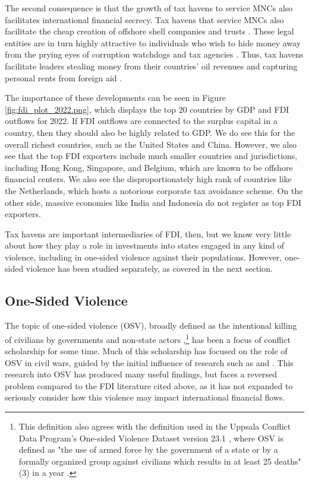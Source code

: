 \documentclass[11pt, titlepage]{article} %
\begin{document}
The second consequence is that the growth of tax havens to service MNCs also facilitates international financial secrecy. Tax havens that service MNCs also facilitate the cheap creation of offshore shell companies and trusts \parencite{findleyGlobalShellGames2012}. These legal entities are in turn highly attractive to individuals who wish to hide money away from the prying eyes of corruption watchdogs and tax agencies \parencite{christensenLootingContinuesTax2011, cooleyTransnationalCorruptionGlobalized2017}. Thus, tax havens facilitate leaders stealing money from their countries’ oil revenues \parencite{andersenPetroRentsPolitical2017} and capturing personal rents from foreign aid \parencite{andersenEliteCaptureForeign2020}. 

The importance of these developments can be seen in Figure \ref{fig:fdi_plot_2022.png}, which displays the top 20 countries by GDP and FDI outflows for 2022. If FDI outflows are connected to the surplus capital in a country, then they should also be highly related to GDP. We do see this for the overall richest countries, such as the United States and China. However, we also see that the top FDI exporters include much smaller countries and jurisdictions, including Hong Kong, Singapore, and Belgium, which are known to be offshore financial centers. We also see the disproportionately high rank of countries like the Netherlands, which hosts a notorious corporate tax avoidance scheme. On the other side, massive economies like India and Indonesia do not register as top FDI exporters. 

Tax havens are important intermediaries of FDI, then, but we know very little about how they play a role in investments into states engaged in any kind of violence, including in one-sided violence against their populations. However, one-sided violence has been studied separately, as covered in the next section. 

\subsection*{One-Sided Violence}

The topic of one-sided violence (OSV), broadly defined as the intentional killing of civilians by governments and non-state actors \parencite{fjelde2021introducing},\footnote{This definition also agrees with the definition used in the Uppsala Conflict Data Program’s One-sided Violence Dataset version 23.1 \parencite{eck2007one,davies2023organized}, where OSV is defined as "the use of armed force by the government of a state or by a formally organized group against civilians which results in at least 25 deaths" (3) in a year \parencite{pettersson2023codebook}.}  has been a focus of conflict scholarship for some time. Much of this scholarship has focused on the role of OSV in civil wars, guided by the initial influence of research such as \textcite{kalyvas2006logic} and \textcite{Weinstein07}. This research into OSV has produced many useful findings, but faces a reversed problem compared to the FDI literature cited above, as it has not expanded to seriously consider how this violence may impact international financial flows.
\end{document}

